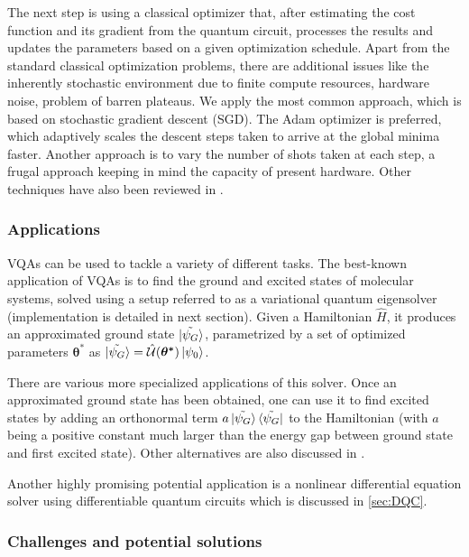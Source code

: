 \documentclass[11pt,a4paper]{article}
\begin{document}
The next step is using a classical optimizer that, after estimating the cost function and its gradient from the quantum circuit, processes the results and updates the parameters based on a given optimization schedule. Apart from the standard classical optimization problems, there are additional issues like the inherently stochastic environment due to finite compute resources, hardware noise, problem of barren plateaus. We apply the most common approach, which is based on stochastic gradient descent (SGD). The Adam optimizer is preferred, which adaptively scales the descent steps taken to arrive at the global minima faster. Another approach is to vary the number of shots taken at each step, a frugal approach keeping in mind the capacity of present hardware. Other techniques have also been reviewed in \cite{VQA}.

\subsubsection{Applications}

VQAs can be used to tackle a variety of different tasks. The best-known application of VQAs is to find the ground and excited states of molecular systems, solved using a setup referred to as a variational quantum eigensolver (implementation is detailed in next section). Given a Hamiltonian $\hat{H}$, it produces an approximated ground state $\ket{\Tilde{\psi_G}}$, parametrized by a set of optimized parameters $\boldsymbol{\theta^*}$ as $\ket{\Tilde{\psi_G}} =\mathcal{\hat{U}}(\boldsymbol{\theta^*}) \ket{\psi_0}$.

There are various more specialized applications of this solver. Once an approximated ground state has been obtained, one can use it to find excited states by adding an orthonormal term $a\ket{\Tilde{\psi_G}}\bra{\Tilde{\psi_G}}$ to the Hamiltonian (with $a$ being a positive constant much larger than the energy gap between ground state and first excited state). Other alternatives are also discussed in \cite{VQA}.

Another highly promising potential application is a nonlinear differential equation solver using differentiable quantum circuits \cite{DQC} which is discussed in \ref{sec:DQC}.

\subsubsection{Challenges and potential solutions}
\end{document}
